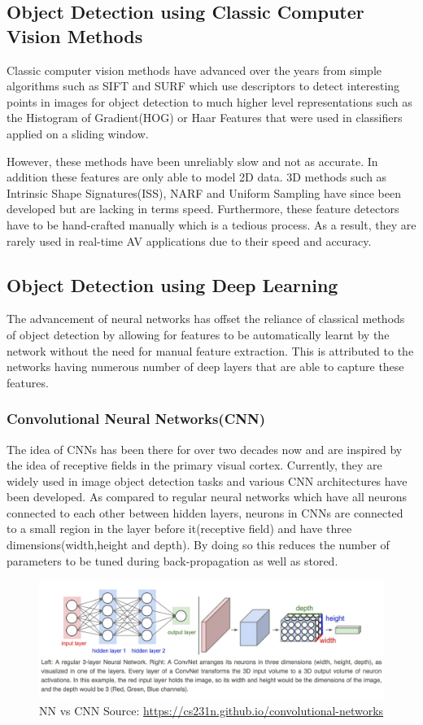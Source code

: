 \subsection{Object Detection using Classic Computer Vision Methods}
Classic computer vision methods have advanced over the years from simple algorithms such as SIFT\cite{lowe1999object} and SURF\cite{bay2006surf} which use descriptors to detect interesting points in images for object detection to much higher level representations such as the Histogram of Gradient(HOG)\cite{dalal2005histograms} or Haar Features\cite{viola2001rapid}  that were used in classifiers applied on a sliding window. 

However, these methods have been unreliably slow and not as accurate. In addition these features are only able to model 2D data. 3D methods such as Intrinsic Shape Signatures(ISS)\cite{zhong2009intrinsic}, NARF\cite{steder2010narf} and Uniform Sampling have since been developed but are lacking in terms speed. Furthermore, these feature detectors have to be hand-crafted manually which is a tedious process. As a result, they are rarely used in real-time AV applications due to their speed and accuracy.

\subsection{Object Detection using Deep Learning}
The advancement of neural networks has offset the reliance of classical methods of object detection by allowing for features to be automatically learnt by the network without the need for manual feature extraction. This is attributed to the networks having numerous number of deep layers that are able to capture these features.  
\subsubsection*{Convolutional Neural Networks(CNN)}
The idea of CNNs has been there for over two decades now and are inspired by the idea of receptive fields in the primary visual cortex. Currently, they are widely used in image object detection tasks and various CNN architectures have been developed. As compared to regular neural networks which have all neurons connected to each other between hidden layers, neurons in CNNs are connected to a small region in the layer before it(receptive field) and have three dimensions(width,height and depth). By doing so this reduces the number of parameters to be tuned during back-propagation as well as stored. 
\begin{figure}[h]
	\centering 
	\includegraphics[width=\linewidth]{images/neuralnet}
	\caption{NN vs CNN Source: \url{https://cs231n.github.io/convolutional-networks}}
	\label{fig:cnn}
\end{figure}


